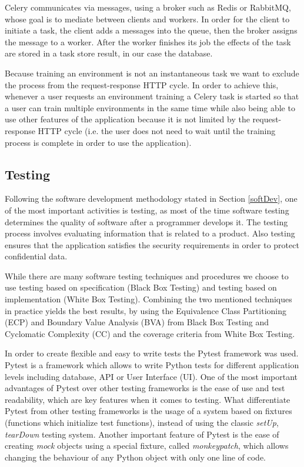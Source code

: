 \par Celery communicates via messages, using a broker such as Redis or RabbitMQ, whose goal is to mediate between clients and workers. In order for the client to initiate a task, the client adds a messages into the queue, then the broker assigns the message to a worker. After the worker finishes its job the effects of the task are stored in a task store result, in our case the database.

\par Because training an environment is not an instantaneous task we want to exclude the process from the request-response HTTP cycle. In order to achieve this, whenever a user requests an environment training a Celery task is started so that a user can train multiple environments in the same time while also being able to use other features of the application because it is not limited by the request-response HTTP cycle (i.e. the user does not need to wait until the training process is complete in order to use the application).

\subsection{Testing}
Following the software development methodology stated in Section \ref{softDev}, one of the most important activities is testing, as most of the time software testing determines the quality of software after a programmer develops it. The testing process involves evaluating information that is related to a product. Also testing ensures that the application satisfies the security requirements in order to protect confidential data.
\par While there are many software testing techniques and procedures we choose to use testing based on specification (Black Box Testing) and testing based on implementation (White Box Testing). Combining the two mentioned techniques in practice yields the best results, by using the Equivalence Class Partitioning (ECP) and Boundary Value Analysis (BVA) from Black Box Testing and Cyclomatic Complexity (CC) and the coverage criteria from White Box Testing.
\par In order to create flexible and easy to write tests the Pytest\cite{pytest} framework was used. Pytest is a framework which allows to write Python tests for different application levels including database, API or User Interface (UI). One of the most important advantages of Pytest over other testing frameworks is the ease of use and test readability, which are key features when it comes to testing.
What differentiate Pytest from other testing frameworks is the usage of a system based on fixtures (functions which initialize test functions), instead of using the classic \emph{setUp}, \emph{tearDown} testing system.
Another important feature of Pytest is the ease of creating \emph{mock} objects using a special fixture, called \emph{monkeypatch}, which allows changing the behaviour of any Python object with only one line of code.

